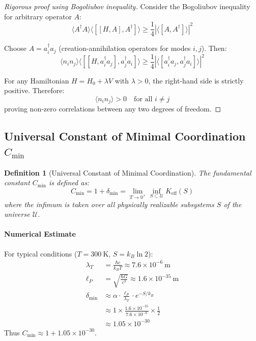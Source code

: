 \documentclass[11pt,a4paper]{article}
\newtheorem{definition}{Definition}
\begin{document}
\begin{proof}[Rigorous proof using Bogoliubov inequality]
	Consider the Bogoliubov inequality for arbitrary operator $A$:
	\begin{equation}
		\langle A^\dagger A \rangle \langle [[H, A], A^\dagger] \rangle \geq \frac{1}{4} |\langle [A, A^\dagger] \rangle|^2
	\end{equation}
	
	Choose $A = a_i^\dagger a_j$ (creation-annihilation operators for modes $i,j$). Then:
	\begin{equation}
		\langle n_i n_j \rangle \langle [[H, a_i^\dagger a_j], a_j^\dagger a_i] \rangle \geq \frac{1}{4} |\langle [a_i^\dagger a_j, a_j^\dagger a_i] \rangle|^2
	\end{equation}
	
	For any Hamiltonian $H = H_0 + \lambda V$ with $\lambda > 0$, the right-hand side is strictly positive. Therefore:
	\begin{equation}
		\langle n_i n_j \rangle > 0 \quad \text{for all } i \neq j
	\end{equation}
	proving non-zero correlations between any two degrees of freedom.
\end{proof}

\subsection{Universal Constant of Minimal Coordination $C_{\min}$}

\begin{definition}[Universal Constant of Minimal Coordination]
	The fundamental constant $C_{\min}$ is defined as:
	\begin{equation}
		C_{\min} = 1 + \delta_{\min} = \lim_{T \to 0^+} \inf_{S \subset \mathcal{U}} K_{\mathrm{eff}}(S)
	\end{equation}
	where the infimum is taken over all physically realizable subsystems $S$ of the universe $\mathcal{U}$.
\end{definition}

\paragraph{Numerical Estimate}
For typical conditions ($T = 300\ \mathrm{K}$, $S = k_B \ln 2$):
\begin{align}
	\lambda_T &= \frac{\hbar c}{k_B T} \approx 7.6 \times 10^{-6}\ \mathrm{m} \\
	\ell_P &= \sqrt{\frac{\hbar G}{c^3}} \approx 1.6 \times 10^{-35}\ \mathrm{m} \\
	\delta_{\min} &\approx \alpha \cdot \frac{\ell_P}{\lambda_T} \cdot e^{-S/k_B} \\
	&\approx 1 \times \frac{1.6 \times 10^{-35}}{7.6 \times 10^{-6}} \times \frac{1}{2} \\
	&\approx 1.05 \times 10^{-30}
\end{align}
Thus $C_{\min} \approx 1 + 1.05 \times 10^{-30}$.
\end{document}
